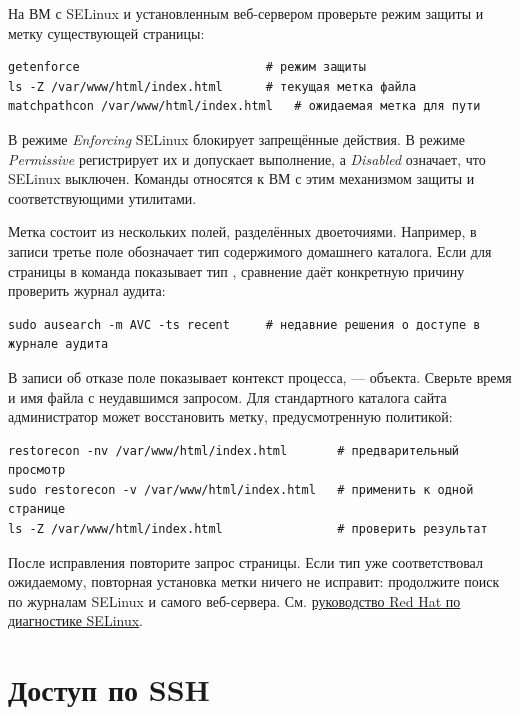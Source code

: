 На ВМ с SELinux и установленным веб-сервером проверьте режим защиты и
метку существующей страницы:

\begin{verbatim}
getenforce                          # режим защиты
ls -Z /var/www/html/index.html      # текущая метка файла
matchpathcon /var/www/html/index.html   # ожидаемая метка для пути
\end{verbatim}

В режиме \emph{Enforcing} SELinux блокирует запрещённые действия.
В режиме \emph{Permissive} регистрирует их и допускает выполнение,
а \emph{Disabled} означает, что SELinux выключен. Команды относятся
к ВМ с этим механизмом защиты и соответствующими утилитами.

Метка состоит из нескольких полей, разделённых двоеточиями.
Например, в записи 
третье поле  обозначает тип содержимого домашнего
каталога. Если для страницы в  команда
 показывает тип , сравнение
даёт конкретную причину проверить журнал аудита:

\begin{verbatim}
sudo ausearch -m AVC -ts recent     # недавние решения о доступе в журнале аудита
\end{verbatim}

В записи об отказе  поле  показывает
контекст процесса,  --- объекта. Сверьте время и имя
файла с неудавшимся запросом. Для стандартного каталога сайта
администратор может восстановить метку, предусмотренную политикой:

\begin{verbatim}
restorecon -nv /var/www/html/index.html       # предварительный просмотр
sudo restorecon -v /var/www/html/index.html   # применить к одной странице
ls -Z /var/www/html/index.html                # проверить результат
\end{verbatim}

После исправления повторите запрос страницы. Если тип уже соответствовал
ожидаемому, повторная установка метки ничего не исправит: продолжите
поиск по журналам SELinux и самого веб-сервера.
См. \href{https://docs.redhat.com/en/documentation/red_hat_enterprise_linux/9/html/using_selinux/troubleshooting-problems-related-to-selinux_using-selinux}{руководство Red Hat по диагностике SELinux}.

\section{Доступ по SSH}

